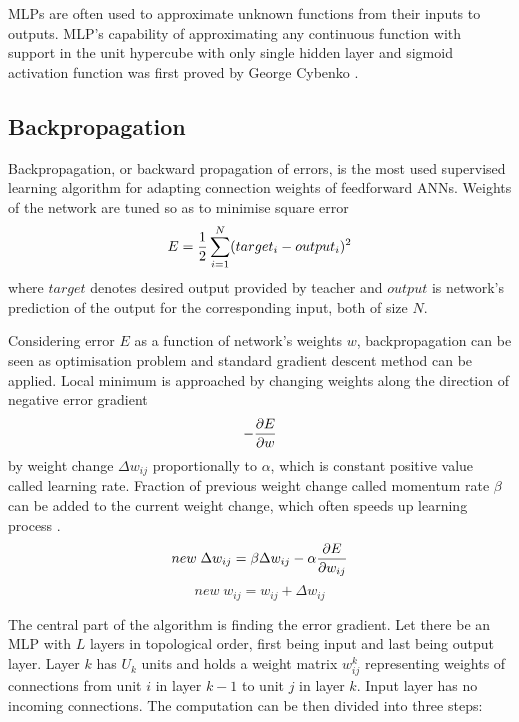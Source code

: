 \documentclass[12pt,oneside]{fithesis2}
\begin{document}
MLPs are often used to approximate unknown functions from their inputs to outputs. MLP's capability of approximating any continuous function with support in the unit hypercube with only single hidden layer and sigmoid activation function was first proved by George Cybenko \cite{universal-approx-theorem}.

\subsection{Backpropagation}
\label{bp}
Backpropagation, or backward propagation of errors, is the most used supervised learning algorithm for adapting connection weights of feedforward ANNs. Weights of the network are tuned so as to minimise square error
$$E = {1 \over 2} \sum\limits_{i=1}^{N}(target_i - output_i)^2$$
where $target$ denotes desired output provided by teacher and $output$ is network's prediction of the output for the corresponding input, both of size $N$. \par
Considering error $E$ as a function of network's weights $w$, backpropagation can be seen as optimisation problem and standard gradient descent method can be applied. Local minimum is approached by changing weights along the direction of negative error gradient 
$$-{{\partial E} \over {\partial w}}$$
by weight change $\Delta w_{ij}$ proportionally to $\alpha$, which is constant positive value called learning rate. Fraction of previous weight change called momentum rate $\beta$ can be added to the current weight change, which often speeds up learning process \cite{sutskever}.
$$new \; \Delta w_{ij} = \beta \Delta w_{ij} - \alpha {{\partial E} \over {\partial w_{ij}}}$$
$$new \; w_{ij} = w_{ij} + \Delta w_{ij} $$


The central part of the algorithm is finding the error gradient. Let there be an MLP with $L$ layers in topological order, first being input and last being output layer. Layer $k$ has $U_k$ units and holds a weight matrix $w_{ij}^k$ representing weights of connections from unit $i$ in layer $k - 1$ to unit $j$ in layer $k$. Input layer has no incoming connections. The computation can be then divided into three steps:
\end{document}

